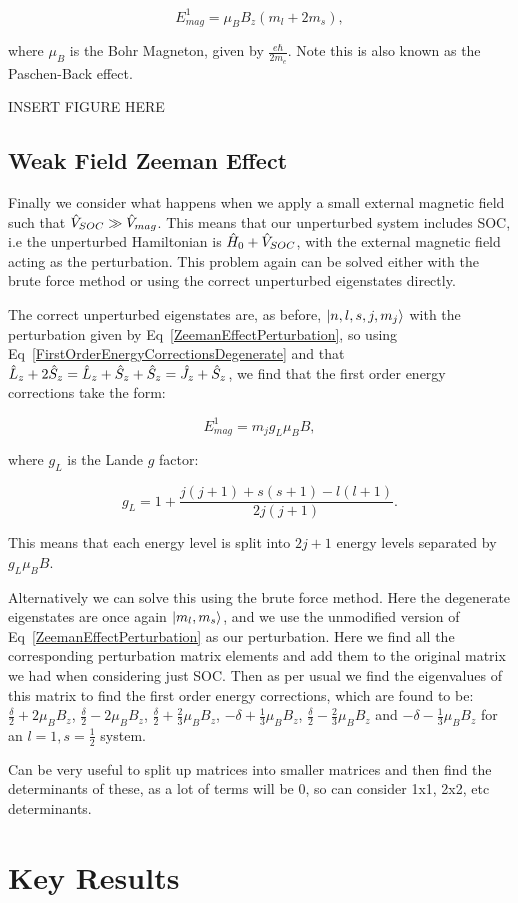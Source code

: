 \begin{equation}
    \boxed{E^1_{mag} = \mu_B B_z (m_l + 2m_s)},
    \label{ZeemanEffectEnergyCorrections}
\end{equation}

\noindent where $\mu_B$ is the Bohr Magneton, given by $\frac{e\hbar}{2m_e}$. Note this is also known as the Paschen-Back effect. 

INSERT FIGURE HERE

\subsection{Weak Field Zeeman Effect}

Finally we consider what happens when we apply a small external magnetic field such that $\Hat{V}_{SOC} \gg \Hat{V}_{mag}$. This means that our unperturbed system includes SOC, i.e the unperturbed Hamiltonian is $\Hat{H}_0 + \Hat{V}_{SOC}$, with the external magnetic field acting as the perturbation. This problem again can be solved either with the brute force method or using the correct unperturbed eigenstates directly.

\noindent The correct unperturbed eigenstates are, as before, $\ket{n, l, s, j, m_j}$ with the perturbation given by Eq~\ref{ZeemanEffectPerturbation}, so using Eq~\ref{FirstOrderEnergyCorrectionsDegenerate} and that $\Hat{L}_z + 2\Hat{S}_z = \Hat{L}_z + \Hat{S}_z + \Hat{S}_z = \Hat{J}_z + \Hat{S}_z$, we find that the first order energy corrections take the form:

\begin{equation}
    \boxed{E^1_{mag} = m_j g_L \mu_B B},
    \label{WeakFieldEnergyCorrections}
\end{equation}

\noindent where $g_L$ is the Lande $g$ factor:

\begin{equation}
    \boxed{g_L = 1 + \frac{j (j + 1) + s (s + 1) - l (l + 1)}{2j(j + 1)}}
    \label{LandGFactor}.
\end{equation}

\noindent This means that each energy level is split into $2j + 1$ energy levels separated by $g_L \mu_B B$.

\noindent Alternatively we can solve this using the brute force method. Here the degenerate eigenstates are once again $\ket{m_l, m_s}$, and we use the unmodified version of Eq~\ref{ZeemanEffectPerturbation} as our perturbation. Here we find all the corresponding perturbation matrix elements and add them to the original matrix we had when considering just SOC. Then as per usual we find the eigenvalues of this matrix to find the first order energy corrections, which are found to be: $\frac{\delta}{2} + 2\mu_B B_z$, $\frac{\delta}{2} - 2\mu_B B_z$, $\frac{\delta}{2} + \frac{2}{3}\mu_B B_z$, $-\delta + \frac{1}{3}\mu_B B_z$, $\frac{\delta}{2} - \frac{2}{3}\mu_B B_z$ and $-\delta - \frac{1}{3}\mu_B B_z$ for an $l = 1, s = \frac{1}{2}$ system.


\noindent Can be very useful to split up matrices into smaller matrices and then find the determinants of these, as a lot of terms will be 0, so can consider 1x1, 2x2, etc determinants.

\section{Key Results}
